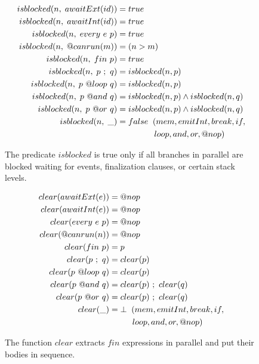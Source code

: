 \begin{figure}
{\small
\begin{align*}
  isblocked(n, \1 awaitExt(id)) &= true                                   \\
  isblocked(n, \1 awaitInt(id)) &= true                                   \\
  isblocked(n, \1 every~e~p)    &= true                                   \\
  isblocked(n, \1 @canrun(m))   &= (n > m)                                \\
  isblocked(n, \1 fin~p)        &= true                                   \\
  isblocked(n, \1 p~;~q)        &= isblocked(n,p)                         \\
  isblocked(n, \1 p~@loop~q)    &= isblocked(n,p)                         \\
  isblocked(n, \1 p~@and~q)     &= isblocked(n,p) \wedge isblocked(n,q)   \\
  isblocked(n, \1 p~@or~q)      &= isblocked(n,p) \wedge isblocked(n,q)   \\
  isblocked(n, \1 \_)           &= false \2 (mem,emitInt,break,if,        \\
                                & \5\5\5\1 loop,and,or,@nop)   %
\end{align*}
}
\caption{
The predicate $isblocked$ is true only if all branches in parallel are blocked
waiting for events, finalization clauses, or certain stack levels.
\label{fig.isblocked}
}
\end{figure}

\begin{figure}[b]
{\small
\begin{align*}
  clear( awaitExt(e) ) &= @nop                  \\
  clear( awaitInt(e) ) &= @nop                  \\
  clear( every~e~p )   &= @nop                  \\
  clear( @canrun(n) )  &= @nop                  \\
  clear( fin~p )       &= p                     \\
  clear( p~;~q )       &= clear(p)              \\
  clear( p~@loop~q )   &= clear(p)              \\
  clear( p~@and~q )    &= clear(p)~;~clear(q)   \\
  clear( p~@or~q )     &= clear(p)~;~clear(q)   \\
  clear( \_ )          &= \bot \2 (mem,emitInt,break,if, \\
                                  & \5\5 loop,and,or,@nop) %
\end{align*}
}
\caption{
The function $clear$ extracts $fin$ expressions in parallel and put their 
bodies in sequence.
\label{fig.formal.clear}
}
\end{figure}
